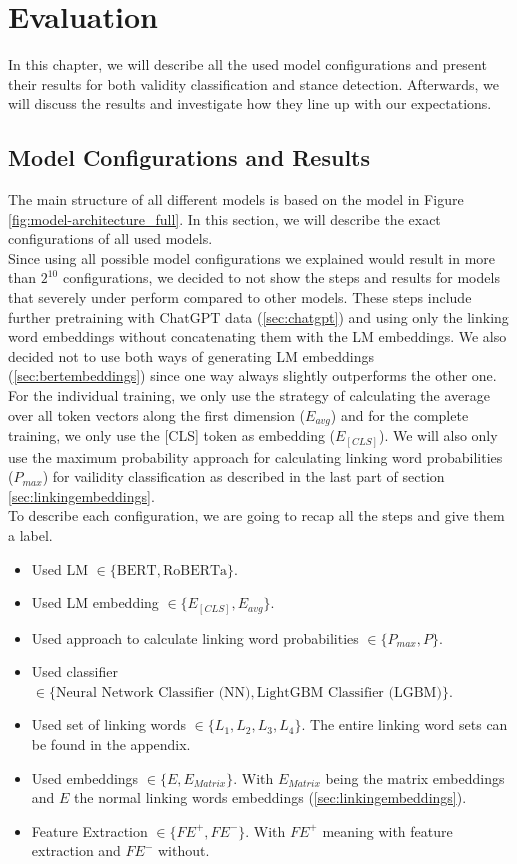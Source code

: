 \section{Evaluation}

In this chapter, we will describe all the used model configurations and present their results for both validity classification and stance detection. Afterwards, we will discuss the results and investigate how they line up with our expectations.

\subsection{Model Configurations and Results}

The main structure of all different models is based on the model in Figure \ref{fig:model-architecture_full}. In this section, we will describe the exact configurations of all used models. \\
Since using all possible model configurations we explained would result in more than $2^{10}$ configurations, we decided to not show the steps and results for models that severely under perform compared to other models. These steps include further pretraining with ChatGPT data (\ref{sec:chatgpt}) and using only the linking word embeddings without concatenating them with the LM embeddings. We also decided not to use both ways of generating LM embeddings (\ref{sec:bertembeddings}) since one way always slightly outperforms the other one. For the individual training, we only use the strategy of calculating the average over all token vectors along the first dimension ($E_{avg}$) and for the complete training, we only use the [CLS] token as embedding ($E_{[CLS]}$). We will also only use the maximum probability approach for calculating linking word probabilities ($P_{max}$) for vailidity classification as described in the last part of section \ref{sec:linkingembeddings}.  \\
To describe each configuration, we are going to recap all the steps and give them a label.
\begin{itemize}
	\item Used LM $\in \{\text{BERT}, \text{RoBERTa}\}$.
	\item Used LM embedding $\in \{E_{[CLS]}, E_{avg}\}$.
	\item Used approach to calculate linking word probabilities $\in \{P_{max}, P\}$.
	\item Used classifier $\in \{\text{Neural Network Classifier (NN)}, \text{LightGBM Classifier (LGBM)}\}$.
	\item Used set of linking words $\in \{L_1, L_2, L_3, L_4\}$. The entire linking word sets can be found in the appendix.
	\item Used embeddings $\in \{E, E_{Matrix}\}$. With $E_{Matrix}$ being the matrix embeddings and $E$ the normal linking words embeddings (\ref{sec:linkingembeddings}).
	\item Feature Extraction $\in \{\textit{FE}^+, \textit{FE}^-\}$. With $\textit{FE}^+$ meaning with feature extraction and $\textit{FE}^-$ without.
\end{itemize}

